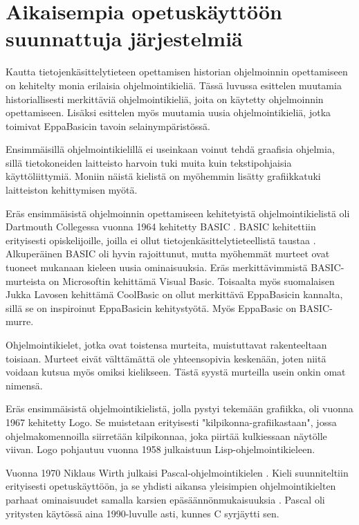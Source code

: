 
\section{Aikaisempia opetuskäyttöön suunnattuja järjestelmiä}
Kautta tietojenkäsittelytieteen
opettamisen historian ohjelmoinnin
opettamiseen on kehitelty
monia erilaisia ohjelmointikieliä.
Tässä luvussa esittelen muutamia
historiallisesti merkittäviä
ohjelmointikieliä, joita
on käytetty ohjelmoinnin opettamiseen.
Lisäksi esittelen myös muutamia uusia
ohjelmointikieliä, jotka toimivat
EppaBasicin tavoin selainympäristössä.

Ensimmäisillä ohjelmointikielillä
ei useinkaan voinut tehdä graafisia
ohjelmia, sillä tietokoneiden
laitteisto harvoin tuki
muita kuin tekstipohjaisia
käyttöliittymiä.
Moniin näistä kielistä
on myöhemmin lisätty
grafiikkatuki laitteiston
kehittymisen myötä.

Eräs ensimmäisistä ohjelmoinnin
opettamiseen kehitetyistä
ohjelmointikielistä oli
Dartmouth Collegessa vuonna 1964
kehitetty BASIC \cite{basic}.
BASIC kehitettiin erityisesti
opiskelijoille, joilla ei ollut
tietojenkäsittelytieteellistä
taustaa \cite{language_history}.
Alkuperäinen BASIC oli hyvin
rajoittunut, mutta myöhemmät
murteet ovat tuoneet mukanaan
kieleen uusia ominaisuuksia.
Eräs merkittävimmistä
BASIC-murteista on
Microsoftin kehittämä
Visual Basic.
Toisaalta myös suomalaisen
Jukka Lavosen kehittämä
CoolBasic on ollut merkittävä
EppaBasicin kannalta, sillä
se on inspiroinut EppaBasicin
kehitystyötä.
Myös EppaBasic on
BASIC-murre.

Ohjelmointikielet, jotka ovat
toistensa murteita,
muistuttavat rakenteeltaan
toisiaan.
Murteet eivät välttämättä
ole yhteensopivia keskenään,
joten niitä voidaan kutsua
myös omiksi kielikseen.
Tästä syystä murteilla
usein onkin omat nimensä.

Eräs ensimmäisistä ohjelmointikielistä,
jolla pystyi tekemään grafiikka,
oli vuonna 1967 kehitetty Logo.
Se muistetaan erityisesti
"kilpikonna-grafiikastaan",
jossa ohjelmakomennoilla
siirretään kilpikonnaa,
joka piirtää kulkiessaan
näytölle viivan.
Logo pohjautuu vuonna 1958
julkaistuun Lisp-ohjelmointikieleen.

Vuonna 1970 Niklaus Wirth
julkaisi Pascal-ohjelmointikielen
\cite{pascal}.
Kieli suunniteltiin erityisesti
opetuskäyttöön, ja se yhdisti
aikansa yleisimpien ohjelmointikielten
parhaat ominaisuudet samalla
karsien epäsäännönmukaisuuksia
\cite{language_history}.
Pascal oli yritysten käytössä aina
1990-luvulle asti, kunnes C
syrjäytti sen.

